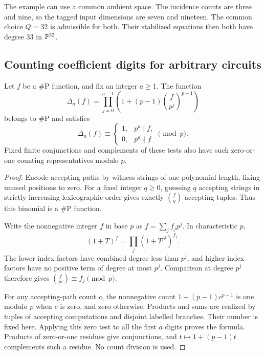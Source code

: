 \begin{example}
The example can use a common ambient space. The incidence counts are
three and nine, so the tagged input dimensions are seven and nineteen.
The common choice $Q=32$ is admissible for both. Their stabilized
equations then both have degree $33$ in $\mathbb P^{32}$.
\end{example}

\subsection{Counting coefficient digits for arbitrary circuits}
\begin{lemma}\label{fg:lem:digits}
Let $f$ be a $\#\mathrm P$ function, and fix an integer $a\ge1$.
The function
\[
 \Delta_a(f)=
 \prod_{j=0}^{a-1}
 \left(1+(p-1)\binom{f}{p^j}^{p-1}\right)
\]
belongs to $\#\mathrm P$ and satisfies
\[
 \Delta_a(f)\equiv
 \begin{cases}
 1,&p^a\mid f,\\
 0,&p^a\nmid f
 \end{cases}\pmod p.
\]
Fixed finite conjunctions and complements of these tests also have
such zero-or-one counting representatives modulo $p$.
\end{lemma}

\begin{proof}
Encode accepting paths by witness strings of one polynomial length,
fixing unused positions to zero. For a fixed integer $q\ge0$,
guessing $q$ accepting strings in strictly increasing lexicographic
order gives exactly $\binom{f}{q}$ accepting tuples. Thus this
binomial is a $\#\mathrm P$ function.

Write the nonnegative integer $f$ in base $p$ as
$f=\sum_j f_jp^j$. In characteristic $p$,
\[
 (1+T)^f=\prod_j(1+T^{p^j})^{f_j}.
\]
The lower-index factors have combined degree less than $p^j$, and
higher-index factors have no positive term of degree at most $p^j$.
Comparison at degree $p^j$ therefore gives
$\binom{f}{p^j}\equiv f_j\pmod p$.

For any accepting-path count $c$, the nonnegative count
$1+(p-1)c^{p-1}$ is one modulo $p$ when $c$ is zero, and zero
otherwise. Products and sums are realized by tuples of accepting
computations and disjoint labelled branches. Their number is fixed
here. Applying this zero test to all the first $a$ digits proves the
formula. Products of zero-or-one residues give conjunctions, and
$t\mapsto1+(p-1)t$ complements such a residue. No count division is
used.
\end{proof}

